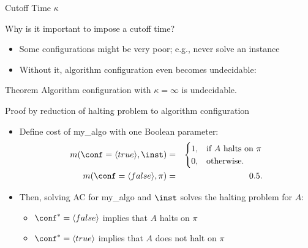 \begin{frame}[c]{Cutoff Time $\kappa$}


Why is it important to impose a cutoff time?
\hands

\pause

\begin{itemize}
\item Some configurations might be very poor; e.g., never solve an instance
\pause
\item Without it, algorithm configuration even becomes undecidable:
\end{itemize}

\begin{block}{Theorem}
Algorithm configuration with $\kappa = \infty$ is undecidable.
\end{block}

\pause


\begin{block}{Proof by reduction of halting problem to algorithm configuration}
\begin{itemize}
\item Define cost of my\_algo with one Boolean parameter:
\vspace*{-0.4cm}
\begin{eqnarray}
\nonumber{}  m(\conf= \langle true \rangle,\inst )&=&
\begin{cases}
1, & \text{if $A$ halts on $\pi$}\\
0, & \text{otherwise}.
\end{cases}\\
\nonumber{}  m(\conf=\langle false \rangle, \pi) &=& 0.5.
\end{eqnarray}
\pause
\vspace*{-0.6cm}
\item Then, solving AC for my\_algo and $\inst$ solves the halting problem for $A$:
\begin{itemize}
\item $\conf^* = \langle false \rangle$ implies that $A$ halts on $\pi$ 
\item $\conf^* = \langle true \rangle$ implies that $A$ does not halt on $\pi$ 
\end{itemize}
\end{itemize}
\end{block}

\end{frame}



